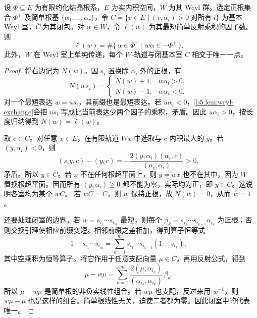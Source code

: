 \begin{theorem}\label{b5:thm:weyl-chambers-length}
	设 \(\Phi\subseteq E\) 为有限约化结晶根系，\(E\) 为实内积空间，\(W\) 为其 Weyl 群。选定正根集合 \(\Phi^+\) 及简单根基 \(\{\alpha_1,\ldots,\alpha_r\}\)，令 \(C=\{v\in E\mid(v,\alpha_i)>0\;\text{对所有}\;i\}\) 为基本 Weyl 室，\(\overline C\) 为其闭包。对 \(w\in W\)，令 \(\ell(w)\) 为其最短简单反射乘积的因子数。则
	\begin{equation}\label{b5:eq:weyl-length-inversions}
		\ell(w)=\#\{\,\alpha\in\Phi^+\mid w\alpha\in-\Phi^+\,\}.
	\end{equation}
	此外，\(W\) 在 Weyl 室上单纯传递，每个 \(W\)-轨道与闭基本室 \(\overline C\) 相交于唯一一点。
\end{theorem}
\begin{proof}
	将右边记为 \(N(w)\)。因 \(s_i\) 置换除 \(\alpha_i\) 外的正根，有
	\[
		N(ws_i)=
		\begin{cases}
			N(w)+1,&w\alpha_i>0,\\
			N(w)-1,&w\alpha_i<0.
		\end{cases}
	\]
	对一个最短表达 \(w=us_i\)，其前缀也是最短表达。若 \(u\alpha_i<0\)，\cref{b5:lem:weyl-exchange}会把 \(us_i\) 写成比当前表达少两个因子的乘积，矛盾。因此 \(u\alpha_i>0\)，按长度归纳得到 \(N(w)=\ell(w)\)。

	取 \(c\in C\)。对任意 \(x\in E\)，在有限轨道 \(Wx\) 中选取与 \(c\) 内积最大的 \(y\)。若 \((y,\alpha_i)<0\)，则
	\[
		(s_i y,c)-(y,c) =-\frac{2(y,\alpha_i)(\alpha_i,c)}{(\alpha_i,\alpha_i)}>0,
	\]
	矛盾。所以 \(y\in\overline C\)。若 \(x\) 不在任何根超平面上，则 \(y=wx\) 也不在其中，因为 \(W\) 置换根超平面。因而所有 \((y,\alpha_i)\ge0\) 都不能为零，实际均为正，即 \(y\in C\)。这说明各室均为某个 \(wC\)。 若 \(wC=C\)，则 \(w\) 保持正根，故 \(N(w)=0\)，从而 \(w=1\)。

	还要处理闭室的边界。若 \(w=s_{i_1}\cdots s_{i_m}\) 最短，则每个 \(\beta_k=s_{i_1}\cdots s_{i_{k-1}}\alpha_{i_k}\) 为正根；否则交换引理使相应前缀变短。相邻前缀之差相加，得到算子恒等式
	\[
		1-s_{i_1}\cdots s_{i_m} =\sum_{k=1}^m s_{i_1}\cdots s_{i_{k-1}}(1-s_{i_k}),
	\]
	其中空乘积为恒等算子。将它作用于任意支配向量 \(\mu\in\overline C\)，再用反射公式，得到
	\begin{equation}\label{b5:eq:dominant-weyl-difference}
		\mu-w\mu =\sum_{k=1}^m \frac{2(\mu,\alpha_{i_k})}{(\alpha_{i_k},\alpha_{i_k})}\,\beta_k.
	\end{equation}
	所以 \(\mu-w\mu\) 是简单根的非负实线性组合。若 \(w\mu\) 也支配，反过来用 \(w^{-1}\)，则 \(w\mu-\mu\) 也是这样的组合。简单根线性无关，迫使二者都为零。因此闭室中的代表唯一。
\end{proof}

